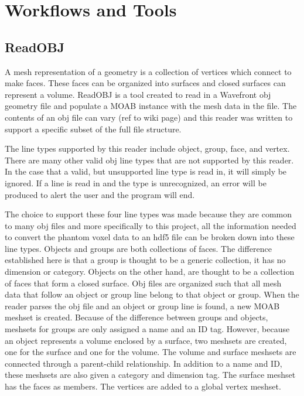 \clearpage
\section{Workflows and Tools}


\subsection{ReadOBJ}
A mesh representation of a geometry is a collection of vertices which connect to make faces.  
These faces can be organized into surfaces and closed surfaces can represent a volume.                     
ReadOBJ is a tool created to read in a Wavefront obj geometry file and populate a MOAB instance 
with the mesh data in the file.  The contents of an obj file can vary (ref to wiki page) and this 
reader was written to support a specific subset of the full file structure. 

The line types supported by this reader include object, group, face, and vertex.  
There are many other valid obj line types that are not supported by this reader.  
In the case that a valid, but unsupported line type is read in, it will simply be ignored.  
If a line is read in and the type is unrecognized, an error will be produced to alert the user
 and the program will end.  

The choice to support these four line types was made because they are common to many obj files
and more specifically to this project, all the information needed to convert the phantom voxel data
to an hdf5 file can be broken down into these line types.  Objects and groups are both collections
of faces.  The difference established here is that a group is thought to be a generic collection, 
it has no dimension or category.  Objects on the other hand, are thought to be a collection of faces
that form a closed surface.  Obj files are organized such that all mesh data that follow an object 
or group line belong to that object or group.  When the reader parses the obj file and an object 
or group line is found, a new MOAB meshset is created.  Because of the difference between groups 
and objects, meshsets for groups are only assigned a name and an ID tag.  However, because an object 
represents a volume enclosed by a surface, two meshsets are created, one for the surface and one for
the volume.  The volume and surface meshsets are connected through a parent-child relationship.  
In addition to a name and ID, these meshsets are also given a category and dimension tag.  The surface
meshset has the faces as members.  The vertices are added to a global vertex meshset.

